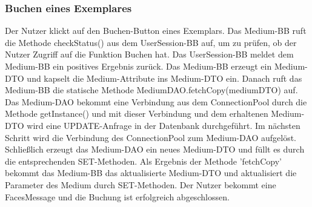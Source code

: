 \documentclass{article}
\begin{document}
\subsubsection{Buchen eines Exemplares}
Der Nutzer klickt auf den Buchen-Button eines Exemplars. Das Medium-BB ruft die Methode checkStatus() aus dem UserSession-BB auf, um zu prüfen, ob der Nutzer Zugriff auf die Funktion Buchen hat. Das UserSession-BB meldet dem Medium-BB ein positives Ergebnis zurück. Das Medium-BB erzeugt ein Medium-DTO und kapselt die Medium-Attribute ins Medium-DTO ein. Danach ruft das Medium-BB die statische Methode MediumDAO.fetchCopy(mediumDTO) auf. Das Medium-DAO bekommt eine Verbindung aus dem ConnectionPool durch die Methode getInstance() und mit dieser Verbindung und dem erhaltenen Medium-DTO wird eine UPDATE-Anfrage in der Datenbank durchgeführt. Im nächsten Schritt wird die Verbindung des ConnectionPool zum Medium-DAO aufgelöst. Schließlich erzeugt das Medium-DAO ein neues Medium-DTO und füllt es durch die entsprechenden SET-Methoden. Als Ergebnis der Methode 'fetchCopy' bekommt das Medium-BB das aktualisierte Medium-DTO und aktualisiert die Parameter des Medium durch SET-Methoden. Der Nutzer bekommt eine FacesMessage und die Buchung ist erfolgreich abgeschlossen.
\newpage

\end{document}

